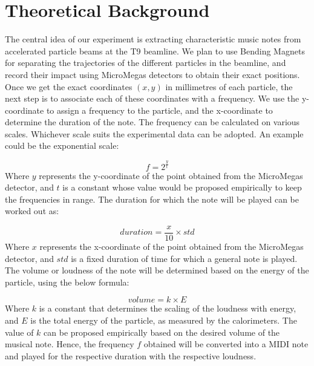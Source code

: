 \section{\textbf{Theoretical Background}}
\hspace{5mm} The central idea of our experiment is extracting characteristic music notes from accelerated particle beams at the T9 beamline. We plan to use Bending Magnets for separating the trajectories of the different particles in the beamline, and record their impact using MicroMegas detectors to obtain their exact positions. Once we get the exact coordinates $(x, y)$ in millimetres of each particle, the next step is to associate each of these coordinates with a frequency. We use the y-coordinate to assign a frequency to the particle, and the x-coordinate to determine the duration of the note. The frequency can be calculated on various scales. Whichever scale suits the experimental data can be adopted. An example could be the exponential scale: 

\begin{equation}
f = 2^{\frac{y}{t}}
\end{equation}
Where $y$ represents the y-coordinate of the point obtained from the MicroMegas detector, and $t$ is a constant whose value would be proposed empirically to keep the frequencies in range. The duration for which the note will be played can be worked out as: 

\begin{equation}
duration = \frac{x}{10} \times std
\end{equation}
Where $x$ represents the x-coordinate of the point obtained from the MicroMegas detector, and $std$ is a fixed duration of time for which a general note is played. The volume or loudness of the note will be determined based on the energy of the particle, using the below formula:

\begin{equation}
volume = k \times E
\end{equation}
Where $k$ is a constant that determines the scaling of the loudness with energy, and $E$ is the total energy of the particle, as measured by the calorimeters. The value of $k$ can be proposed empirically based on the desired volume of the musical note. Hence, the frequency $f$ obtained will be converted into a MIDI note and played for the respective duration with the respective loudness.
